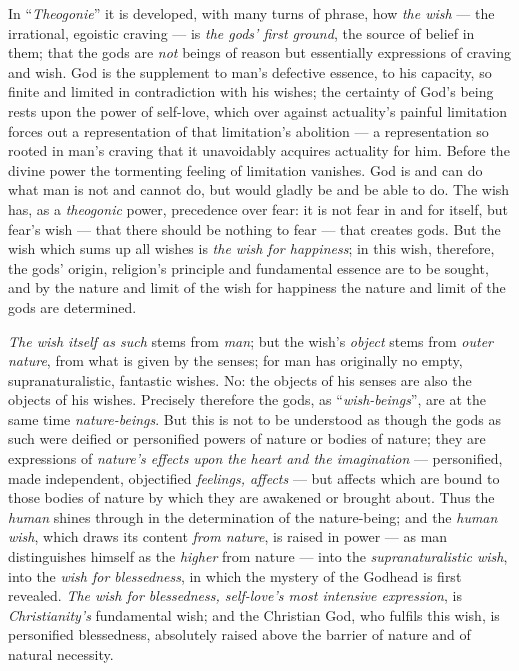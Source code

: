 \documentclass[12pt,a4paper]{book}
\begin{document}
In ``\emph{Theogonie}'' it is developed, with many turns of phrase, how
\emph{the wish} --- the irrational, egoistic craving --- is \emph{the gods'
first ground}, the source of belief in them; that the gods are \emph{not}
beings of reason but essentially expressions of craving and wish. God is the
supplement to man's defective essence, to his capacity, so finite and limited
in contradiction with his wishes; the certainty of God's being rests upon the
power of self-love, which over against actuality's painful limitation forces
out a representation of that limitation's abolition --- a representation so
rooted in man's craving that it unavoidably acquires actuality for him. Before
the divine power the tormenting feeling of limitation vanishes. God is and can
do what man is not and cannot do, but would gladly be and be able to do. The
wish has, as a \emph{theogonic} power, precedence over fear:
it is not fear in and for itself, but fear's wish --- that there should be
nothing to fear --- that creates gods. But the wish which sums up all wishes
is \emph{the wish for happiness}; in this wish, therefore, the gods' origin,
religion's principle and fundamental essence are to be sought, and by the
nature and limit of the wish for happiness the nature and limit of the gods
are determined.

\emph{The wish itself as such} stems from \emph{man}; but the wish's
\emph{object} stems from \emph{outer nature}, from what is given by the
senses; for man has originally no empty, supranaturalistic, fantastic wishes.
No: the objects of his senses are also the objects of his wishes. Precisely
therefore the gods, as ``\emph{wish-beings}'', are at the same time
\emph{nature-beings}. But this is not to be understood as though the gods as
such were deified or personified powers of nature or bodies of nature; they
are expressions of \emph{nature's effects upon the heart and the imagination}
--- personified, made independent, objectified \emph{feelings, affects} --- but
affects which are bound to those bodies of nature by which they are awakened
or brought about. Thus the \emph{human} shines through in the determination of
the nature-being; and the \emph{human wish}, which draws its content
\emph{from nature}, is raised in power --- as man distinguishes himself as the
\emph{higher} from nature --- into the \emph{supranaturalistic wish}, into the
\emph{wish for blessedness}, in which the mystery of the Godhead is first
revealed. \emph{The wish for blessedness, self-love's most intensive
expression}, is \emph{Christianity's} fundamental wish; and the Christian God,
who fulfils this wish, is personified blessedness, absolutely raised above the
barrier of nature and of natural necessity.
\end{document}
